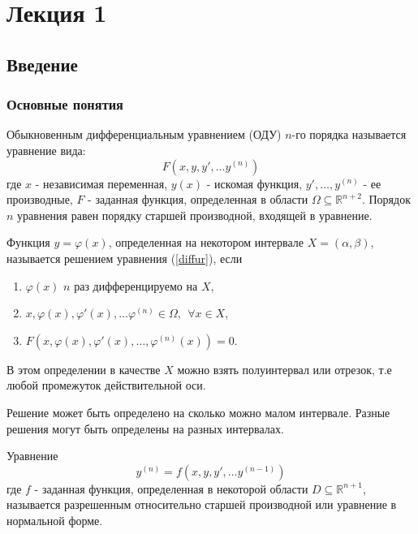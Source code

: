   \section{Лекция 1}
  \subsection{Введение}
  \subsubsection{Основные понятия}
  \begin{df}
  Обыкновенным дифференциальным уравнением {(ОДУ)} $n$-го порядка называется уравнение вида:
  \begin{equation}
  \label{diffur}
  F(x, y, y', \ldots y^{(n)})
  \end{equation}
  где $x$ - независимая переменная, $y(x)$ - искомая функция, $ y', \ldots, y^{(n)} $ - ее производные, $F$ - заданная функция, определенная в области $\Omega \subseteq \mathbb{R}^{n+2}$. Порядок $n$ уравнения равен порядку старшей производной, входящей в уравнение. 
  \end{df}
  
  \begin{df}
  Функция $y = \varphi(x)$, определенная на некотором интервале $X = (\alpha, \beta)$, называется решением уравнения (\ref{diffur}), если 
  \begin{enumerate}
  \item $\varphi(x)$ $n$ раз дифференцируемо на $X$,
  \item $x, \varphi(x), \varphi'(x), \ldots \varphi^{(n)} \in \Omega,~~ \forall x \in X$,
  \item $F(x, \varphi(x), \varphi'(x), \ldots, \varphi^{(n)}(x)) = 0$.
  \end{enumerate}
  \end{df}
  \begin{ntc}
  В этом определении в качестве $X$ можно взять полуинтервал или отрезок, т.е любой промежуток действительной оси.
  \end{ntc}
  \begin{ntc}
  Решение может быть определено на сколько можно малом интервале. Разные решения могут быть определены на разных интервалах.
  \end{ntc}
  
  \begin{df}
  Уравнение 
  \begin{equation}
  \label{normaldiffur}
  y^{(n)} = f(x, y, y', \ldots y^{(n-1)})
  \end{equation}
  где $f$ - заданная функция, определенная в некоторой области $D \subseteq \mathbb{R}^{n+1}$, называется разрешенным относительно старшей производной или уравнение в нормальной форме.
  \end{df}
  
